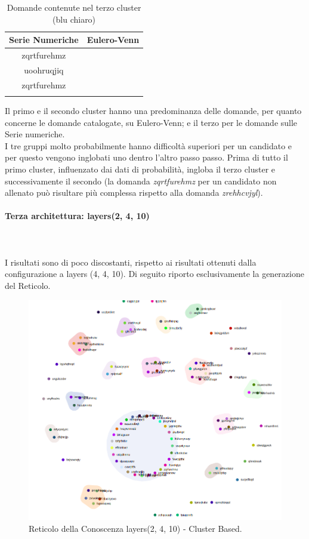 \begin{longtable}{|c|c|}
	\hline
	\textbf{Serie Numeriche} & \textbf{Eulero-Venn} \\\hline\hline
	zqrtfurehmz &  \\
	uoohruqjiq  & \\
	zqrtfurehmz & \\
	
\hline
\caption{Domande contenute nel terzo cluster (blu chiaro)}\label{tab:Domande contenute nel terzo cluster}
\end{longtable}
\noindent
Il primo e il secondo cluster hanno una predominanza delle domande, per quanto concerne le domande catalogate, su Eulero-Venn; e il terzo per le domande sulle Serie numeriche.\\
I tre gruppi molto probabilmente hanno difficolt\`a superiori per un candidato e per questo vengono inglobati uno dentro l'altro passo passo.
Prima di tutto il primo cluster, influenzato dai dati di probabilit\`a, ingloba il terzo cluster e successivamente il secondo (la domanda \textit{zqrtfurehmz} per un candidato non allenato pu\`o risultare pi\`u complessa rispetto alla domanda \textit{zrehhcvjyl}).

\paragraph{Terza architettura: layers(2, 4, 10)}\mbox{}\\\\
\label{Terza architettura}
\noindent
I risultati sono di poco discostanti, rispetto ai risultati ottenuti dalla configurazione a layers (4, 4, 10). Di seguito riporto esclusivamente la generazione del Reticolo.

\begin{figure}[H]
\centering
	\includegraphics[width=0.70\linewidth]{./image/logica(2,4,10).png}
	\caption{Reticolo della Conoscenza layers(2, 4, 10) - Cluster Based.}
	\label{Reticolo della Conoscenza layers(2, 4, 10) - Cluster Based.}
\end{figure}
\noindent


